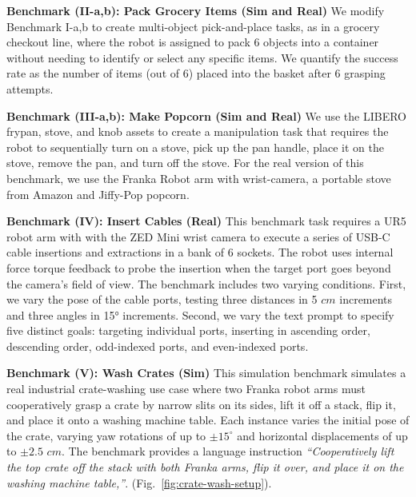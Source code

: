 \textbf{Benchmark (II-a,b): Pack Grocery Items (Sim and Real)} We modify Benchmark I-a,b to create multi-object pick-and-place tasks, as in a grocery checkout line, where the robot is assigned to pack 6 objects into a container without needing to identify or select any specific items. We quantify the success rate as the number of items (out of 6) placed into the basket after 6 grasping attempts. 

\textbf{Benchmark (III-a,b): Make Popcorn (Sim and Real)} We use the LIBERO frypan, stove, and knob assets to create a manipulation task that requires the robot to sequentially turn on a stove, pick up the pan handle, place it on the stove, remove the pan, and turn off the stove.  For the real version of this benchmark, we use the Franka Robot arm with wrist-camera, a portable stove from Amazon and Jiffy-Pop popcorn.

\textbf{Benchmark (IV): Insert Cables (Real)} This benchmark task requires a UR5 robot arm with with the ZED Mini wrist camera to execute a series of USB-C cable insertions and extractions in a bank of 6 sockets.  The robot uses internal force torque feedback to probe the insertion when the target port goes beyond the camera's field of view.  The benchmark includes two varying conditions. First, we vary the pose of the cable ports, testing three distances in 5 {\small{$cm$}} increments and three angles in 15° increments. Second, we vary the text prompt to specify five distinct goals: targeting individual ports, inserting in ascending order, descending order, odd-indexed ports, and even-indexed ports.  

\textbf{Benchmark (V): Wash Crates (Sim) } This simulation benchmark simulates a real industrial crate-washing use case where two Franka robot arms must cooperatively grasp a crate by narrow slits on its sides, lift it off a stack, flip it, and place it onto a washing machine table.  Each instance varies the initial pose of the crate, varying yaw rotations of up to $\pm15^{\circ}$ and horizontal displacements of up to $\pm2.5$ {\small{$cm$}}.
The benchmark provides a language instruction \textit{``Cooperatively lift the top crate off the stack with both Franka arms, flip it over, and place it on the washing machine table,''}. (Fig.~\ref{fig:crate-wash-setup}).



